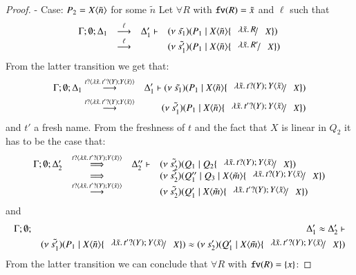 \begin{proof}
	\noi - Case: $P_2 = X\langle \tilde{n} \rangle$ for some $\tilde{n}$
%
	Let $\forall R$ with $\mathtt{fv}(R) = \tilde{x}$ and $\ell$ such that
\[
	\begin{array}{rcll}
		\Gamma; \es; \Delta_1 &\by{\ell}& \Delta_1' \proves & \newsp{\tilde{s_1}}{P_1 \Par \appl{X}{\tilde{n}} \subst{\abs{\tilde{x}}{R}}{X}}\\
		&\by{\ell}& &
		\newsp{\tilde{s_1'}}{P_1 \Par \appl{X}{\tilde{n}} \subst{\abs{\tilde{x}}{R'}}{X}}
	\end{array}
\]
%
	\noi From the latter transition we get that:
%
	\begin{eqnarray}
		\Gamma; \es; \Delta_1 &\by{\bactinp{t}{\abs{\tilde{x}}{\binp{t'}{Y} \appl{Y}{\tilde{x}}}}}& \Delta_1' \proves \newsp{\tilde{s_1}}{P_1 \Par \appl{X}{\tilde{n}} \subst{\abs{\tilde{x}}{\binp{t}{Y} \appl{Y}{\tilde{x}}}}{X}} \nonumber \\
		&\by{\bactinp{t}{\abs{\tilde{x}}{\binp{t'}{Y} \appl{Y}{\tilde{x}}}}}& 
		\newsp{\tilde{s_1'}}{P_1 \Par \appl{X}{\tilde{n}} \subst{\abs{\tilde{x}}{\binp{t'}{Y} \appl{Y}{\tilde{x}}}}{X}}
		\label{lem:subst_equiv5}
	\end{eqnarray}
%
	\noi and $t'$ a fresh name. From the freshness of $t$ and the fact that $X$ is linear in $Q_2$
	it has to be the case that:
%
\[
	\begin{array}{rcll}
		\Gamma; \es; \Delta_2' &\By{\bactinp{t}{\abs{\tilde{x}}{\binp{t'}{Y} \appl{Y}{\tilde{x}}}}}& \Delta_2'' \proves &
		\newsp{\tilde{s_2'}}{Q_1 \Par Q_2 \subst{\abs{\tilde{x}}{\binp{t}{Y} \appl{Y}{\tilde{x}}}}{X}}\\
		&\By{}& &
		\newsp{\tilde{s_2'}}{Q_1'' \Par Q_3 \Par \appl{X}{\tilde{m}} \subst{\abs{\tilde{x}}{\binp{t}{Y} \appl{Y}{\tilde{x}}}}{X}} \\
		&\by{\bactinp{t}{\abs{\tilde{x}}{\binp{t'}{Y} \appl{Y}{\tilde{x}}}}}& &
		\newsp{\tilde{s_2'}}{Q_1' \Par \appl{X}{\tilde{m}} \subst{\abs{\tilde{x}}{\binp{t'}{Y} \appl{Y}{\tilde{x}}}}{X}} \\
	\end{array}
\]
%
	\noi and
%
	\begin{eqnarray}
		\Gamma; \es; &&\Delta_1' \wb \Delta_2' \proves \nonumber \\
		&&\newsp{\tilde{s_1'}}{P_1 \Par \appl{X}{\tilde{n}} \subst{\abs{\tilde{x}}{\binp{t'}{Y} \appl{Y}{\tilde{x}}}}{X}} \wb \newsp{s_2'}{Q_1' \Par \appl{X}{\tilde{m}} \subst{\abs{\tilde{x}}{\binp{t'}{Y} \appl{Y}{\tilde{x}}}}{X}}
		\label{lem:subst_equiv6}
	\end{eqnarray} 
%
	\noi From the latter transition we can conclude that $\forall R$ with $\mathtt{fv}(R) = \{x\}$:

\end{proof}
